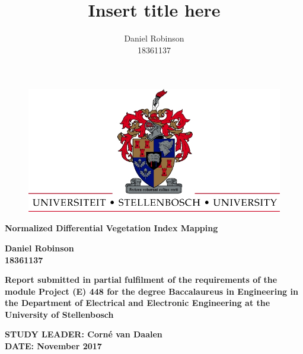 


\title{Insert title here}
\author{Daniel Robinson\\18361137}

\setlength\parindent{0pt}


    \begin{titlepage}
        \begin{center}
            \vspace*{1cm}
            
            \begin{figure}
			\centering
            \includegraphics[scale=2]{images/UScrest-top.jpg}
            \end{figure}
            
            \huge
            \textbf{Normalized Differential Vegetation Index Mapping}

            \large            
            \vspace{2.5cm}

            \textbf{Daniel Robinson\\18361137}

            \vspace{2.5cm}    
            
            \textbf{Report submitted in partial fulfilment of the requirements of the module Project (E) 448
            for the degree Baccalaureus in Engineering in the Department of Electrical and Electronic
            Engineering at the University of Stellenbosch}
            
            \vspace{4cm} 
            
            \textbf{STUDY LEADER: Corné van Daalen\\DATE: November 2017}
            
            
        \end{center}
\end{titlepage}

